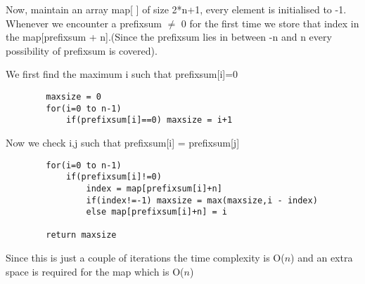 \documentclass[12pt]{article}
\begin{document}
\begin{enumerate}
    Now, maintain an array map[ ] of size 2*n+1, every element is initialised to -1. Whenever we encounter a prefixsum $\neq$ 0 for the first time we store that index in the map[prefixsum + n].(Since the prefixsum lies in between -n and n every possibility of prefixsum is covered).
    
    We first find the maximum i such that prefixsum[i]=0
    \begin{verbatim}
        maxsize = 0
        for(i=0 to n-1) 
            if(prefixsum[i]==0) maxsize = i+1
    \end{verbatim}
    
    Now we check i,j such that prefixsum[i] = prefixsum[j]
    \begin{verbatim}
        for(i=0 to n-1)
            if(prefixsum[i]!=0)
                index = map[prefixsum[i]+n]
                if(index!=-1) maxsize = max(maxsize,i - index)
                else map[prefixsum[i]+n] = i
        
        return maxsize
    \end{verbatim}
    
    Since this is just a couple of iterations the time complexity is O($n$) and an extra space is required for the map which is O($n$)
    

\end{enumerate}
\end{document}
